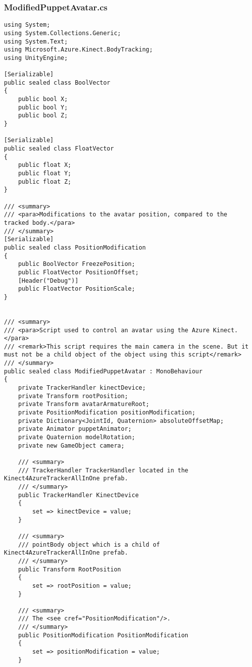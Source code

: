 \subsubsection*{ModifiedPuppetAvatar.cs}
\begin{verbatim}
using System;
using System.Collections.Generic;
using System.Text;
using Microsoft.Azure.Kinect.BodyTracking;
using UnityEngine;

[Serializable]
public sealed class BoolVector
{
    public bool X;
    public bool Y;
    public bool Z;
}

[Serializable]
public sealed class FloatVector
{
    public float X;
    public float Y;
    public float Z;
}

/// <summary>
/// <para>Modifications to the avatar position, compared to the tracked body.</para>
/// </summary>
[Serializable]
public sealed class PositionModification
{
    public BoolVector FreezePosition;
    public FloatVector PositionOffset;
    [Header("Debug")] 
    public FloatVector PositionScale;
}


/// <summary>
/// <para>Script used to control an avatar using the Azure Kinect.</para>
/// <remark>This script requires the main camera in the scene. But it must not be a child object of the object using this script</remark>
/// </summary>
public sealed class ModifiedPuppetAvatar : MonoBehaviour
{
    private TrackerHandler kinectDevice;
    private Transform rootPosition;
    private Transform avatarArmatureRoot;
    private PositionModification positionModification;
    private Dictionary<JointId, Quaternion> absoluteOffsetMap;
    private Animator puppetAnimator;
    private Quaternion modelRotation;
    private new GameObject camera;

    /// <summary>
    /// TrackerHandler TrackerHandler located in the Kinect4AzureTrackerAllInOne prefab.
    /// </summary>
    public TrackerHandler KinectDevice
    {
        set => kinectDevice = value;
    }

    /// <summary>
    /// pointBody object which is a child of Kinect4AzureTrackerAllInOne prefab.
    /// </summary>
    public Transform RootPosition
    {
        set => rootPosition = value;
    }

    /// <summary>
    /// The <see cref="PositionModification"/>.
    /// </summary>
    public PositionModification PositionModification
    {
        set => positionModification = value;
    }


\end{verbatim}
